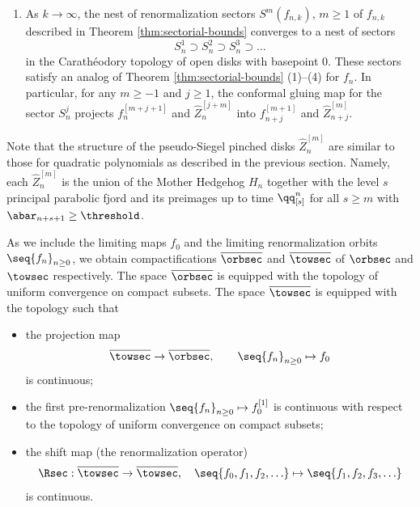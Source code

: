 \documentclass{amsart}
\begin{document}
\begin{theorem}
\begin{enumerate}[label = \textnormal{(\arabic*)}]
        \item 
        As $k \to \infty$, the nest of renormalization sectors $S^m(f_{n,k})$, $m \geq 1$ of $f_{n,k}$ described in Theorem \ref{thm:sectorial-bounds} converges to a nest of sectors 
        \[
        S_n^1 \supset S_n^2 \supset S_n^3 \supset \ldots
        \]
        in the Carath\'eodory topology of open disks with basepoint $0$.
        These sectors satisfy an analog of Theorem \ref{thm:sectorial-bounds} (1)--(4) for $f_n$. 
        In particular, for any $m \geq -1$ and $j \geq 1$, the conformal gluing map for the sector $S_n^j$ projects $f_n^{[m+j+1]}$ and $\hat{Z}^{[j+m]}_n$ into $f_{n+j}^{[m+1]}$ and $\hat{Z}^{[m]}_{n+j}$.
    \end{enumerate}
\end{theorem}

Note that the structure of the pseudo-Siegel pinched disks $\hat{Z}_n^{[m]}$ are similar to those for quadratic polynomials as described in the previous section.
Namely, each $\hat{Z}_n^{[m]}$ is the union of the Mother Hedgehog $H_n$ together with the level $s$ principal parabolic fjord and its preimages up to time $\qq^n_{[s]}$ for all $s \geq m$ with $\abar_{n+s+1} \geq \threshold$.

As we include the limiting maps $f_0$ and the limiting renormalization orbits $\seq{f_n}_{n\geq 0}$, we obtain compactifications $\overline{\orbsec}$ and $\overline{\towsec}$ of $\orbsec$ and $\towsec$ respectively. 
The space $\overline{\orbsec}$ is equipped with the topology of uniform convergence on compact subsets.
The space $\overline{\towsec}$ is equipped with the topology such that
\begin{itemize}
    \item the projection map
    \[
        \overline{\towsec} \to \overline{\orbsec}, \qquad \seq{f_n}_{n\geq 0} \mapsto f_0
    \]
    is continuous;
    \item the first pre-renormalization $\seq{f_n}_{n\geq 0} \mapsto f_0^{[1]}$ is continuous with respect to the topology of uniform convergence on compact subsets;
    \item the shift map (the renormalization operator)
    \begin{equation}
        \label{eq:dfn.Rsec}
        \Rsec: \overline{\towsec} \to \overline{\towsec}, \quad \seq{f_0,f_1,f_2,\ldots} \mapsto \seq{f_1,f_2,f_3,\ldots}
    \end{equation}
    is continuous.
\end{itemize}
\end{document}
